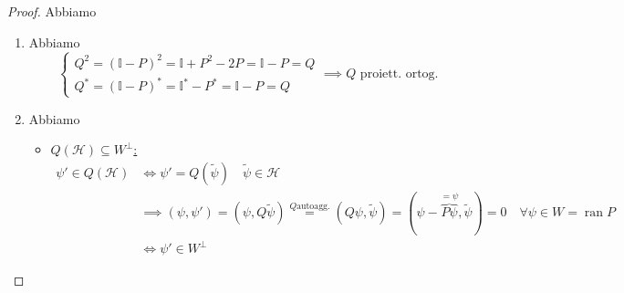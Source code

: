 \documentclass[a4paper,10pt]{article}
\theoremstyle{definition}
\DeclareMathOperator*{\ran}{ran}
\newcommand{\hil}{\mathcal{H}} %
\theoremstyle{indentdefinition}
\theoremstyle{indenttheorem}
\theoremstyle{myremark}
\theoremstyle{indentgeneral}
\begin{document}
\begin{proof}
    Abbiamo
    \begin{enumerate}
        
        \item Abbiamo
        $$\begin{cases}
            Q^2=(\mathbb{I}-P)^2=\mathbb{I}+P^2-2P=\mathbb{I}-P=Q\\
            Q^*=(\mathbb{I}-P)^*=\mathbb{I}^*-P^*=\mathbb{I}-P=Q
        \end{cases}\implies Q\text{ proiett. ortog.}$$
        \item Abbiamo 
        \begin{itemize}
            \item \underline{$Q(\hil)\subseteq W^\perp$:} 
            \begin{align*}
                \psi'\in Q(\hil) &\iff \psi'=Q(\widetilde{\psi}) \quad \widetilde{\psi}\in\hil \\
                &\implies (\psi,\psi')=(\psi,Q\widetilde{\psi})\overset{Q\text{autoagg.}}{=}(Q\psi,\widetilde{\psi})=(\psi-\overbrace{P\psi}^{=\psi},\widetilde{\psi})=0 \quad \forall \psi\in W=\ran P\\
                &\iff \psi'\in W^\perp
            \end{align*}
          

\end{itemize}
\end{enumerate}
\end{proof}
\end{document}
